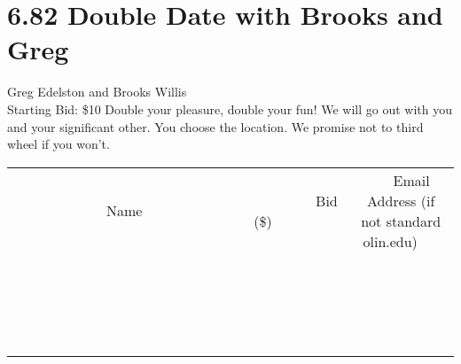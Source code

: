 \documentclass[11pt]{article}
\begin{document}
\section*{6.82 Double Date with Brooks and Greg}
Greg Edelston and Brooks Willis
\\
Starting Bid: \$10
\newline
Double your pleasure, double your fun! We will go out with you and your significant other. You choose the location. We promise not to third wheel if you won't.
\\[3ex]
\begin{tabular}{c c c}
~~~~~~~~~~~~~Name~~~~~~~~~~~~~ & ~~~~~~~~~Bid (\$)~~~~~~~~~  & ~~~Email Address (if not standard olin.edu)~~~\\
 & & \\
\hline
 & & \\
\hline
 & & \\
\hline
 & & \\
\hline
 & & \\
\hline
 & & \\
\hline
 & & \\
\hline
 & & \\
\hline
 & & \\
\hline
 & & \\
\hline
 & & \\
\hline
 & & \\
\hline
 & & \\
\hline
 & & \\
\hline
 & & \\
\hline
 & & \\
\hline
 & & \\
\hline
 & & \\
\hline
 & & \\
\hline
\end{tabular}
\newpage
\end{document}
